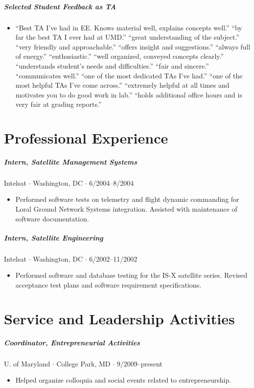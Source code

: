 \documentclass[10pt,letterpaper]{article}
\begin{document}
\subparagraph{Selected Student Feedback as TA}
\begin{itemize}
	\item ``Best TA I've had in EE. Knows material well, explains concepts well.'' ``by far the best TA I ever had at UMD.''  ``great understanding of the subject.'' ``very friendly and approachable.'' ``offers insight and suggestions.'' ``always full of energy.''  ``enthusiastic.'' ``well organized, conveyed concepts clearly.'' ``understands student's needs and difficulties.'' ``fair and sincere.'' ``communicates well.'' ``one of the most dedicated TAs I've had.'' ``one of the most helpful TAs I've come across.'' ``extremely helpful at all times and motivates you to do good work in lab.'' ``holds additional office hours and is very fair at grading reports.''
\end{itemize}

\section*{Professional Experience}

\subparagraph{Intern, Satellite Management Systems}
Intelsat $\cdot$ Washington, DC $\cdot$ 6/2004--8/2004
\begin{itemize}
\item Performed software tests on telemetry and flight dynamic commanding for Loral Ground Network Systems integration. Assisted with maintenance of software documentation.
\end{itemize}

\subparagraph{Intern, Satellite Engineering}
Intelsat $\cdot$ Washington, DC $\cdot$ 6/2002--11/2002
\begin{itemize}
\item Performed software and database testing for the IS-X satellite series. Revised acceptance test plans and software requirement specifications.
\end{itemize}

\section*{Service and Leadership Activities}

\subparagraph{Coordinator, Entrepreneurial Activities}
U. of Maryland $\cdot$ College Park, MD $\cdot$ 9/2009--present
\begin{itemize}
\item Helped organize colloquia and social events related to entrepreneurship.
\end{itemize}
	
\end{document}
